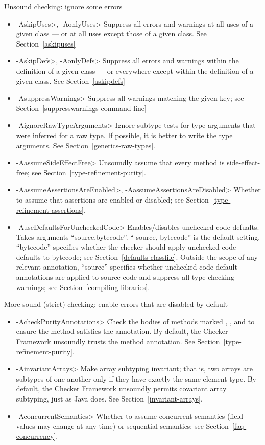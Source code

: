 Unsound checking: ignore some errors
\begin{itemize}
\item \<-AskipUses>, \<-AonlyUses>
  Suppress all errors and warnings at all uses of a given class --- or at all
  uses except those of a given class.  See Section~\ref{askipuses}
\item \<-AskipDefs>, \<-AonlyDefs>
  Suppress all errors and warnings within the definition of a given class
  --- or everywhere except within the definition of a given class.  See
  Section~\ref{askipdefs}
\item \<-AsuppressWarnings>
  Suppress all warnings matching the given key; see
  Section~\ref{suppresswarnings-command-line}
\item \<-AignoreRawTypeArguments>
  Ignore subtype tests for type arguments that were inferred for a raw
  type.  If possible, it is better to write the type arguments.  See
  Section~\ref{generics-raw-types}.
\item \<-AassumeSideEffectFree>
  Unsoundly assume that every method is side-effect-free; see
  Section~\ref{type-refinement-purity}.
\item \<-AassumeAssertionsAreEnabled>, \<-AassumeAssertionsAreDisabled>
  Whether to assume that assertions are enabled or disabled; see Section~\ref{type-refinement-assertions}.
\item \<-AuseDefaultsForUncheckedCode>
  Enables/disables unchecked code defualts.  Takes arguments ``source,bytecode''.
  ``-source,-bytecode'' is the default setting.
  ``bytecode'' specifies
  whether the checker should apply unchecked code defaults to
  bytecode; see
  Section~\ref{defaults-classfile}.
  Outside the scope of any relevant
   annotation, ``source'' specifies whether unchecked code
  default annotations are applied to source code and suppress all type-checking warnings; see
  Section~\ref{compiling-libraries}.
\end{itemize}

\label{unsound-by-default}
More sound (strict) checking: enable errors that are disabled by default
\begin{itemize}
\item \<-AcheckPurityAnnotations>
  Check the bodies of methods marked
  ,
  ,
  and 
  to ensure the method satisfies the annotation.  By default,
  the Checker Framework unsoundly trusts the method annotation.  See
  Section~\ref{type-refinement-purity}.
\item \<-AinvariantArrays>
  Make array subtyping invariant; that is, two arrays are subtypes of one
  another only if they have exactly the same element type.  By default,
  the Checker Framework unsoundly permits covariant array subtyping, just
  as Java does.  See Section~\ref{invariant-arrays}.
\item \<-AconcurrentSemantics>
  Whether to assume concurrent semantics (field values may change at any
  time) or sequential semantics; see Section~\ref{faq-concurrency}.
\end{itemize}

